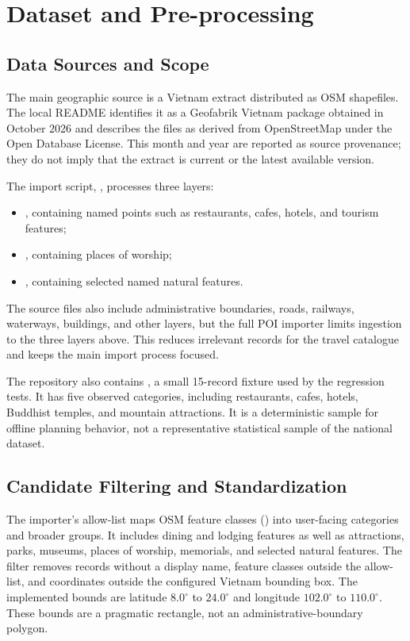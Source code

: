 \chapter{Dataset and Pre-processing}
\label{chap:dataset}

\section{Data Sources and Scope}

The main geographic source is a Vietnam extract distributed as OSM shapefiles. The local README identifies it as a Geofabrik Vietnam package obtained in October 2026 and describes the files as derived from OpenStreetMap under the Open Database License. This month and year are reported as source provenance; they do not imply that the extract is current or the latest available version.

The import script, , processes three layers:
\begin{itemize}[leftmargin=1.8em,itemsep=3pt]
    \item {}, containing named points such as restaurants, cafes, hotels, and tourism features;
    \item {}, containing places of worship;
    \item {}, containing selected named natural features.
\end{itemize}
The source files also include administrative boundaries, roads, railways, waterways, buildings, and other layers, but the full POI importer limits ingestion to the three layers above. This reduces irrelevant records for the travel catalogue and keeps the main import process focused.

The repository also contains , a small 15-record fixture used by the regression tests. It has five observed categories, including restaurants, cafes, hotels, Buddhist temples, and mountain attractions. It is a deterministic sample for offline planning behavior, not a representative statistical sample of the national dataset.

\section{Candidate Filtering and Standardization}

The importer's allow-list maps OSM feature classes () into user-facing categories and broader groups. It includes dining and lodging features as well as attractions, parks, museums, places of worship, memorials, and selected natural features. The filter removes records without a display name, feature classes outside the allow-list, and coordinates outside the configured Vietnam bounding box. The implemented bounds are latitude $8.0^\circ$ to $24.0^\circ$ and longitude $102.0^\circ$ to $110.0^\circ$. These bounds are a pragmatic rectangle, not an administrative-boundary polygon.

